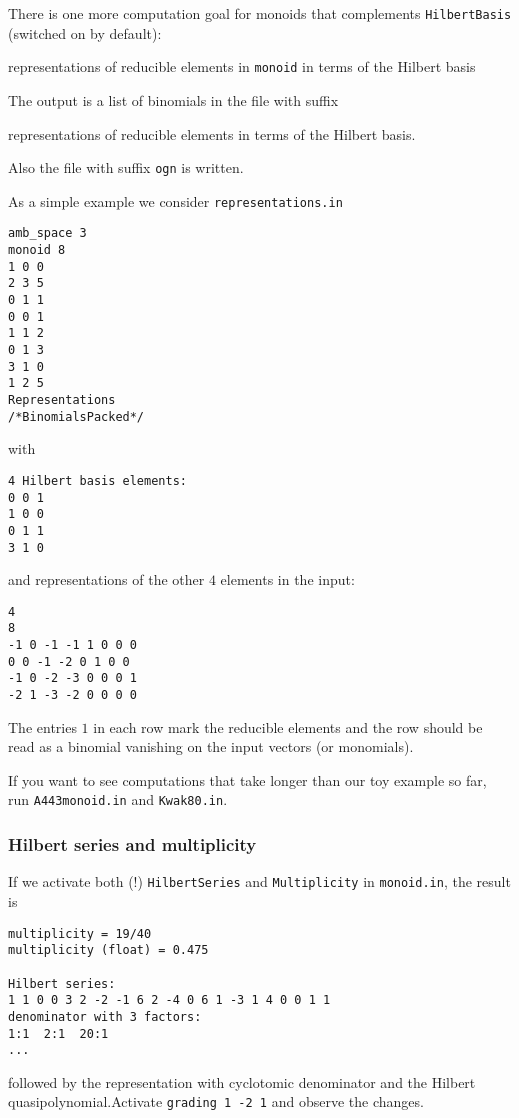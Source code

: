 There is one more computation goal for monoids that complements \verb|HilbertBasis| (switched on by default):
\begin{itemize}
	\itemtt[Representations] representations of reducible elements in \verb|monoid| in terms of the Hilbert basis
\end{itemize}
The output is a list of binomials in the file with suffix
\begin{itemize}
	\itemtt[rep] representations  of reducible elements in terms of the Hilbert basis.
\end{itemize}
Also the file with suffix \verb|ogn| is written.

As a simple example we consider \verb|representations.in|
\begin{Verbatim}
amb_space 3
monoid 8
1 0 0
2 3 5
0 1 1
0 0 1
1 1 2
0 1 3
3 1 0
1 2 5
Representations
/*BinomialsPacked*/
\end{Verbatim}
with
\begin{Verbatim}
4 Hilbert basis elements:
0 0 1
1 0 0
0 1 1
3 1 0
\end{Verbatim}
and representations of the other $4$ elements in the input:
\begin{Verbatim}
4
8
-1 0 -1 -1 1 0 0 0 
0 0 -1 -2 0 1 0 0 
-1 0 -2 -3 0 0 0 1 
-2 1 -3 -2 0 0 0 0
\end{Verbatim}
The entries $1$ in each row mark the reducible elements and the row should be read as a binomial vanishing on the input vectors (or monomials).

If you want to see computations that take longer than our toy example so far, run \verb|A443monoid.in| and \verb|Kwak80.in|.


\subsubsection{Hilbert series and multiplicity}

If we activate both (!) \verb|HilbertSeries| and \verb|Multiplicity| in \verb|monoid.in|, the result is
\begin{Verbatim}
multiplicity = 19/40
multiplicity (float) = 0.475

Hilbert series:
1 1 0 0 3 2 -2 -1 6 2 -4 0 6 1 -3 1 4 0 0 1 1 
denominator with 3 factors:
1:1  2:1  20:1 
... 
\end{Verbatim}
followed by the representation with cyclotomic denominator and the Hilbert quasipolynomial.Activate \verb|grading 1 -2 1| and observe the changes.




